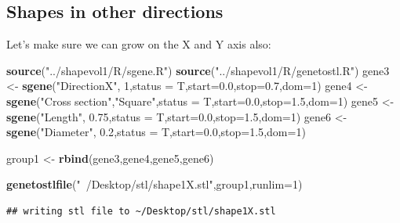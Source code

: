 \documentclass[]{article}
\newenvironment{Shaded}{\begin{snugshade}}{\end{snugshade}}
\newcommand{\DataTypeTok}[1]{\textcolor[rgb]{0.13,0.29,0.53}{#1}}
\newcommand{\DecValTok}[1]{\textcolor[rgb]{0.00,0.00,0.81}{#1}}
\newcommand{\FloatTok}[1]{\textcolor[rgb]{0.00,0.00,0.81}{#1}}
\newcommand{\KeywordTok}[1]{\textcolor[rgb]{0.13,0.29,0.53}{\textbf{#1}}}
\newcommand{\NormalTok}[1]{#1}
\newcommand{\StringTok}[1]{\textcolor[rgb]{0.31,0.60,0.02}{#1}}
\begin{document}
\hypertarget{shapes-in-other-directions}{%
\subsection{Shapes in other
directions}\label{shapes-in-other-directions}}

Let's make sure we can grow on the X and Y axis also:

\begin{Shaded}
\begin{Highlighting}[]
\KeywordTok{source}\NormalTok{(}\StringTok{"../shapevol1/R/sgene.R"}\NormalTok{)}
\KeywordTok{source}\NormalTok{(}\StringTok{"../shapevol1/R/genetostl.R"}\NormalTok{)}
\NormalTok{gene3 <-}\StringTok{ }\KeywordTok{sgene}\NormalTok{(}\StringTok{"DirectionX"}\NormalTok{,          }\DecValTok{1}\NormalTok{,}\DataTypeTok{status =}\NormalTok{ T,}\DataTypeTok{start=}\FloatTok{0.0}\NormalTok{,}\DataTypeTok{stop=}\FloatTok{0.7}\NormalTok{,}\DataTypeTok{dom=}\DecValTok{1}\NormalTok{)}
\NormalTok{gene4 <-}\StringTok{ }\KeywordTok{sgene}\NormalTok{(}\StringTok{"Cross section"}\NormalTok{,}\StringTok{"Square"}\NormalTok{,}\DataTypeTok{status =}\NormalTok{ T,}\DataTypeTok{start=}\FloatTok{0.0}\NormalTok{,}\DataTypeTok{stop=}\FloatTok{1.5}\NormalTok{,}\DataTypeTok{dom=}\DecValTok{1}\NormalTok{)}
\NormalTok{gene5 <-}\StringTok{ }\KeywordTok{sgene}\NormalTok{(}\StringTok{"Length"}\NormalTok{,            }\FloatTok{0.75}\NormalTok{,}\DataTypeTok{status =}\NormalTok{ T,}\DataTypeTok{start=}\FloatTok{0.0}\NormalTok{,}\DataTypeTok{stop=}\FloatTok{1.5}\NormalTok{,}\DataTypeTok{dom=}\DecValTok{1}\NormalTok{)}
\NormalTok{gene6 <-}\StringTok{ }\KeywordTok{sgene}\NormalTok{(}\StringTok{"Diameter"}\NormalTok{,          }\FloatTok{0.2}\NormalTok{,}\DataTypeTok{status =}\NormalTok{ T,}\DataTypeTok{start=}\FloatTok{0.0}\NormalTok{,}\DataTypeTok{stop=}\FloatTok{1.5}\NormalTok{,}\DataTypeTok{dom=}\DecValTok{1}\NormalTok{)}

\NormalTok{group1 <-}\StringTok{ }\KeywordTok{rbind}\NormalTok{(gene3,gene4,gene5,gene6)}

\KeywordTok{genetostlfile}\NormalTok{(}\StringTok{"~/Desktop/stl/shape1X.stl"}\NormalTok{,group1,}\DataTypeTok{runlim=}\DecValTok{1}\NormalTok{)}
\end{Highlighting}
\end{Shaded}

\begin{verbatim}
## writing stl file to ~/Desktop/stl/shape1X.stl
\end{verbatim}
\end{document}
